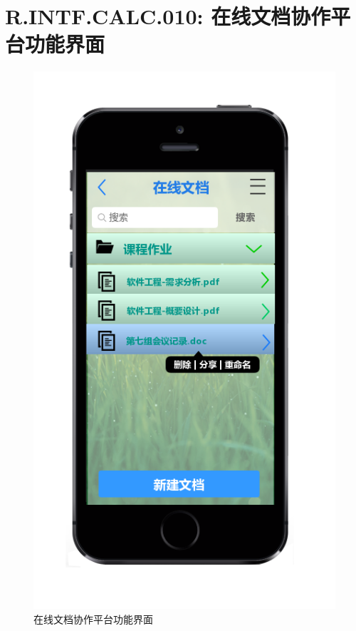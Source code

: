     \section{R.INTF.CALC.010: 在线文档协作平台功能界面}
    \begin{figure}[h]
        \centering
        \includegraphics[scale=0.6]{OutlineDesign/figures/在线文档协作平台功能界面.png}
        \caption{在线文档协作平台功能界面}
        \label{fig:server_flow}
    \end{figure}
    \newpage
